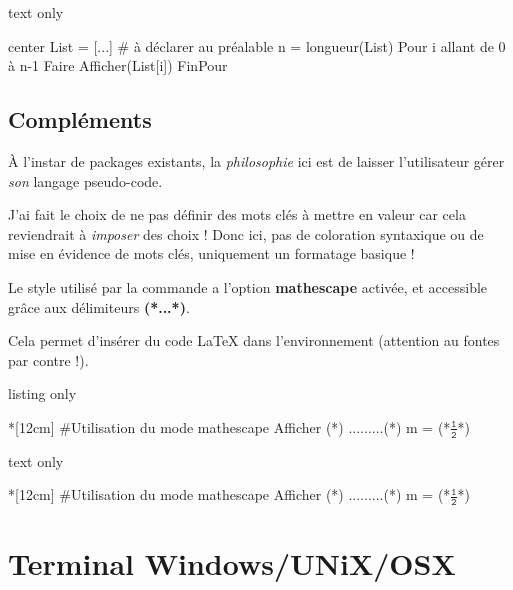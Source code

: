 \documentclass[a4paper,french,11pt]{article}
\newcommand\ctex[1]{\tcbox[vignettelatex]{#1}}
\newcommand\Cle[1]{{\bfseries\sffamily\textlangle \textcolor{orange!75!black}{#1}\textrangle}}
\begin{document}
\begin{PresCodeSortiePL}{text only}
\begin{PseudoCodeAlt}[15cm]{center}
List = [...]          # à déclarer au préalable
n = longueur(List)
Pour i allant de 0 à n-1 Faire
	Afficher(List[i])
FinPour
\end{PseudoCodeAlt}
\end{PresCodeSortiePL}

\subsection{Compléments}

\begin{warningblock}
À l'instar de packages existants, la \textit{philosophie} ici est de laisser l'utilisateur gérer \textit{son} langage pseudo-code.

J'ai fait le choix de ne pas définir des \textsf{mots clés} à mettre en valeur car cela reviendrait à \textit{imposer} des choix ! Donc ici, pas de coloration syntaxique ou de mise en évidence de mots clés, uniquement un formatage basique !
\end{warningblock}

\begin{noteblock}
Le style \ctex{listings} utilisé par la commande a l'option \Cle{mathescape} activée, et accessible grâce aux délimiteurs \Cle{(*...*)}.

Cela permet d'insérer du code \LaTeX{} dans l'environnement \ctex{PseudoCode} (attention au fontes par contre !).
\end{noteblock}

\begin{PresCodeTexPL}{listing only}
\begin{PseudoCode}*[12cm]{}
#Utilisation du mode mathescape
Afficher (*\og*) .........(*\fg*)
m = (*$\tfrac{\texttt{1}}{\texttt{2}}$*)
\end{PseudoCode}
\end{PresCodeTexPL}

\begin{PresCodeSortiePL}{text only}
\begin{PseudoCode}*[12cm]{}
#Utilisation du mode mathescape
Afficher (*\og*) .........(*\fg*)
m = (*$\tfrac{\texttt{1}}{\texttt{2}}$*)
\end{PseudoCode}
\end{PresCodeSortiePL}

\newpage

\section{Terminal Windows/UNiX/OSX}\label{terms}
\end{document}
